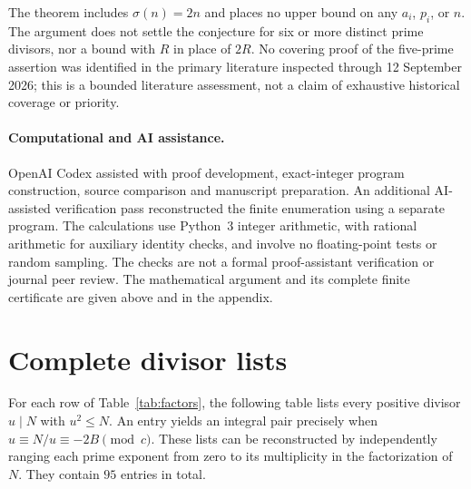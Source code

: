 \documentclass[11pt]{article}
\begin{document}
The theorem includes $\sigma(n)=2n$ and places no upper bound on any
$a_i$, $p_i$, or $n$. The argument does not settle the conjecture for
six or more distinct prime divisors, nor a bound with $R$ in place of
$2R$. No covering proof of the five-prime assertion was identified in
the primary literature inspected through 12 September 2026; this is a
bounded literature assessment, not a claim of exhaustive historical
coverage or priority.

\paragraph{Computational and AI assistance.}
OpenAI Codex assisted with proof development, exact-integer program
construction, source comparison and manuscript preparation.
An additional AI-assisted verification pass reconstructed the finite
enumeration using a separate program. The calculations use Python~3
integer arithmetic, with rational arithmetic for auxiliary identity
checks, and involve no floating-point tests or random sampling.
The checks are not a formal proof-assistant verification or journal
peer review. The mathematical argument and its complete finite
certificate are given above and in the appendix.

\appendix
\section{Complete divisor lists}\label{app:divisors}

For each row of Table~\ref{tab:factors}, the following table lists
every positive divisor $u\mid N$ with $u^2\le N$.
An entry yields an integral pair precisely when
$u\equiv N/u\equiv-2B\pmod c$.
These lists can be reconstructed by independently ranging each prime
exponent from zero to its multiplicity in the factorization of $N$.
They contain $95$ entries in total.
\end{document}
